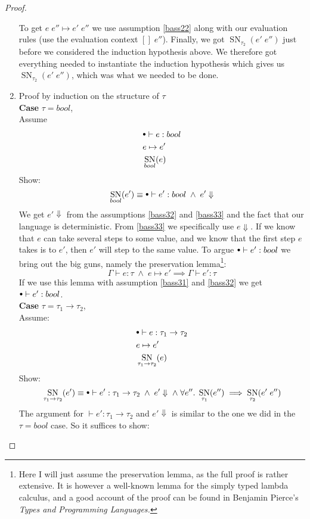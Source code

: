 \documentclass[a4paper,10pt,fleqn]{article}
\DeclareMathOperator{\SNPred}{SN}
\newcommand{\evalto}{\ensuremath{\mapsto}}
\newcommand{\mtenv}{{\raisebox{1.5pt}{$\scriptstyle\bullet$}}}
\newcommand{\case}[1]{~\\{\bf Case} #1,~\\}
\newcommand{\tarrow}[2]{\ensuremath{ #1 \rightarrow #2}}
\newcommand{\SN}[2]{\ensuremath{\SNPred_{#1}(#2)}}
\newcommand{\pand}{\ensuremath{\; \wedge \;}}
\begin{document}
\begin{proof}
\begin{enumerate}
\begin{comment}
                   {\mtenv \vdash e'' : \tau_1}}
                 {\mtenv \vdash e \; e'' : \tau_2}
                 \]
    \end{comment}
To get $e \; e'' \evalto e' \; e''$ we use assumption \ref{bass22} along with our evaluation rules (use the evaluation context $[]\; e''$). Finally, we got $\SN{\tau_2}{e' \; e''}$ just before we considered the induction hypothesis above. We therefore got everything needed to instantiate the induction hypothesis which gives us $\SN{\tau_2}{e' \; e''}$, which was what we needed to be done.
  \item Proof by induction on the structure of $\tau$
    \case{$\tau=bool$} 
Assume
    \begin{align}
      &\mtenv \vdash e : bool \label{bass31}\\
      &e\evalto e' \label{bass32} \\
      &\SN{bool}{e} \label{bass33}
    \end{align}
    Show:
    \[
    \SN{bool}{e'} \equiv \mtenv \vdash e' : bool \pand e' \Downarrow
    \]
  We get $e' \Downarrow$ from the assumptions \ref{bass32} and \ref{bass33} and the fact that our language is deterministic. From \ref{bass33} we specifically use $e \Downarrow$. If we know that $e$ can take several steps to some value, and we know that the first step $e$ takes is to $e'$, then $e'$ will step to the same value. 
To argue $\mtenv \vdash e' : bool$ we bring out the big guns, namely the preservation lemma\footnote{Here I will just assume the preservation lemma, as the full proof is rather extensive. It is however a well-known lemma for the simply typed lambda calculus, and a good account of the proof can be found in Benjamin Pierce's \emph{Types and Programming Languages.}}:
\[
  \Gamma \vdash e : \tau \pand e \evalto e' \implies \Gamma \vdash e' : \tau
\]
If we use this lemma with assumption \ref{bass31} and \ref{bass32} we get $\mtenv \vdash e' : bool$.
%
%
    \case{$\tau=\tarrow{\tau_1}{\tau_2}$} Assume:
    \begin{align}
      &\mtenv \vdash e : \tarrow{\tau_1}{\tau_2} \label{bass41}\\
      &e\evalto e' \label{bass42} \\
      &\SN{\tarrow{\tau_1}{\tau_2}}{e} \label{bass43}
    \end{align}
    Show:
    \[
    \SN{\tarrow{\tau_1}{\tau_2}}{e'} \equiv \mtenv \vdash e' : \tarrow{\tau_1}{\tau_2} \pand e' \Downarrow \pand \forall e''. \; \SN{\tau_1}{e''} \implies \SN{\tau_2}{e' \; e''}
    \]
    The argument for $\vdash e' : \tarrow{\tau_1}{\tau_2}$ and $e' \Downarrow$ is similar to the one we did in the $\tau=bool$ case. So it suffices to show:

\end{enumerate}
\end{proof}
\end{document}
